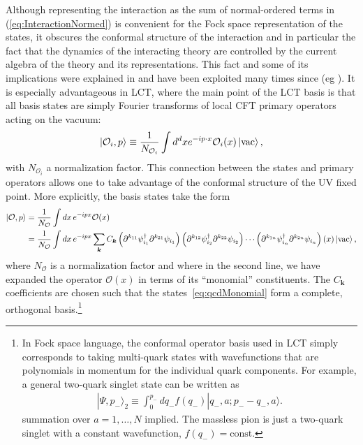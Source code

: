 \documentclass[12pt]{article}
\def\>{\rangle}
\newcommand{\be}{\begin{eqnarray}}
\newcommand{\ee}{\end{eqnarray}}
\newcommand{\Ocal}{{\mathcal O}}
\newcommand{\cO}{{\mathcal O}}
\newcommand{\dagg}{\dagger}
\newcommand{\ptl}{\partial}
\newcommand{\Kvec}{\boldsymbol{k}}
\begin{document}
Although representing the interaction as the sum of normal-ordered terms in (\ref{eq:InteractionNormed}) is convenient for the Fock space representation of the states, it obscures the conformal structure of the interaction and in particular the fact that the dynamics of the interacting theory are controlled by the current algebra of the theory and its representations.  This fact and some of its implications were explained in \cite{Kutasov:1994xq} and have been exploited many times since (eg \cite{Dempsey:2021xpf}).  It is especially advantageous in LCT, where the main point of the LCT basis is that all basis states are simply Fourier transforms of local CFT primary operators acting on the vacuum:
\begin{equation}
	\ket{\cO_i, p} \equiv \frac{1}{N_{\cO_i}} \int d^d x e^{-i p \cdot x} \cO_i(x) \ket{\textrm{vac}}, \label{eq:lctbasis}
\end{equation}
 with $N_{\cO_i}$  a normalization factor.  This connection between the states and primary operators allows one to take advantage of the conformal structure of the UV fixed point.  More explicitly, the basis states take the form
\cite{Katz:2014uoa} \begin{equation}
\label{eq:qcdMonomial}
	\begin{aligned}
		\ket{\Ocal,p} &= \frac{1}{N_{\Ocal}}\int  dx \, e^{-i p x} \cO(x)\\
		&=  \frac{1}{N_{\Ocal}}\int  dx \, e^{-i p x} \sum_{\Kvec} C_{\Kvec} \left( \ptl^{k_{11}} \psi_{i_1}^\dagg \ptl^{k_{21}} \psi_{i_1} \right) \left( \ptl^{k_{12}} \psi_{i_2}^\dagg \ptl^{k_{22}} \psi_{i_2} \right) \dotsb \left( \ptl^{k_{1n}} \psi_{i_n}^\dagg \ptl^{k_{2n}} \psi_{i_n} \right)(x) \ket{\textrm{vac}}, 
	\end{aligned}
\end{equation} where $N_{\cO}$ is a normalization factor and where in the second line, we have expanded the operator $\cO(x)$ in terms of its ``monomial'' constituents.  
The $C_{\Kvec}$ coefficients are chosen such that the states~\eqref{eq:qcdMonomial} form a complete, orthogonal basis.\footnote{In Fock space language, the conformal operator basis used in LCT simply corresponds to taking multi-quark states with wavefunctions that are polynomials in momentum for the individual quark components.  For example,  a general two-quark singlet state can be written as
\be
|\Psi, p_-\>_2 \equiv  \int_0^{p_-}  dq_- f(q_-) | q_- , a; p_- - q_-, a\>.
\ee
summation over $a=1, \dots, N$ implied.  The massless pion is just a two-quark singlet with a constant wavefunction, $f(q_-) = \textrm{const}$. }
\end{document}
